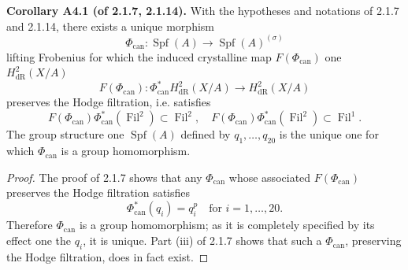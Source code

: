 \documentclass[12pt,a4paper]{article}
\theoremstyle{plain}
\theoremstyle{definition}
\theoremstyle{remark}
\DeclareMathOperator{\Fil}{Fil}
\DeclareMathOperator{\Spf}{Spf}
\begin{document}
\textbf{Corollary A4.1 (of 2.1.7, 2.1.14).} With the hypotheses and notations of 2.1.7 and 2.1.14, there exists a unique morphism
\[
\Phi_{\mathrm{can}} : \Spf(A) \longrightarrow \Spf(A)^{(\sigma)}
\]
lifting Frobenius for which the induced crystalline map $F(\Phi_{\mathrm{can}})$ one $H^2_\mathrm{dR}(X/A)$
\[
F(\Phi_{\mathrm{can}}) : \Phi_{\mathrm{can}}^* H^2_\mathrm{dR}(X/A) \longrightarrow H^2_\mathrm{dR}(X/A)
\]
preserves the Hodge filtration, i.e. satisfies
\[
F(\Phi_{\mathrm{can}})\Phi_{\mathrm{can}}^*(\Fil^2) \subset \Fil^2, \quad F(\Phi_{\mathrm{can}})\Phi_{\mathrm{can}}^*(\Fil^2) \subset \Fil^1.
\]
The group structure one $\Spf(A)$ defined by $q_1, \ldots, q_{20}$ is the unique one for which $\Phi_{\mathrm{can}}$ is a group homomorphism.

\begin{proof}
The proof of 2.1.7 shows that any $\Phi_{\mathrm{can}}$ whose associated $F(\Phi_{\mathrm{can}})$ preserves the Hodge filtration satisfies
\[
\Phi_{\mathrm{can}}^*(q_i) = q_i^p \quad \text{for } i = 1, \ldots, 20.
\]
Therefore $\Phi_{\mathrm{can}}$ is a group homomorphism; as it is completely specified by its effect one the $q_i$, it is unique. Part (iii) of 2.1.7 shows that such a $\Phi_{\mathrm{can}}$, preserving the Hodge filtration, does in fact exist. \qedhere
\end{proof}
\end{document}
